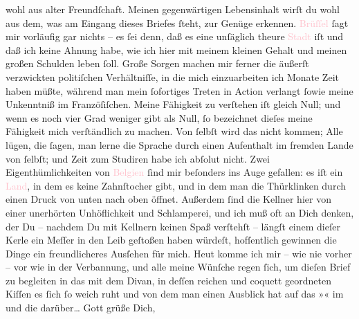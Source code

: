                wohl aus alter Freundſchaft.\pend
           \pstart
           Meinen gegenwärtigen Lebensinhalt wirſt du wohl aus dem, was am Eingang dieses
               Briefes ſteht, zur Genüge erkennen. \textcolor{pink}{Brüſſel}{}\ledrightnote{\textcolor{pink}{Brüssel}} ſagt
               mir vorläufig gar nichts – es ſei denn, daß es eine unſäglich theure \textcolor{pink}{Stadt}{} iſt und daß ich keine Ahnung habe, wie
               ich hier mit meinem kleinen Gehalt und meinen großen Schulden leben ſoll. Große
               Sorgen machen mir ferner die äußerſt verzwickten politiſchen Verhältniſſe, in die
               mich einzuarbeiten ich Monate Zeit haben müßte, während man {\pb}mein ſofortiges Treten in Action verlangt ſowie
               meine Unkenntniß im Franzöſiſchen. Meine Fähigkeit zu verſtehen iſt gleich Null; und
               wenn es noch vier Grad weniger gibt als Null, ſo bezeichnet dieſes meine Fähigkeit
               mich verſtändlich zu machen. Von ſelbſt wird das nicht kommen; Alle lügen, die ſagen,
               man lerne die Sprache durch einen Aufenthalt im fremden Lande von ſelbſt; und Zeit
               zum Studiren habe ich abſolut nicht. Zwei Eigenthümlichkeiten von \textcolor{pink}{Belgien}{}\ledrightnote{\textcolor{pink}{Belgien}} ſind mir beſonders ins Auge gefallen: es iſt ein \textcolor{pink}{Land}{}, in dem es keine
               Zahnſtocher gibt, und in dem man die Thürklinken durch einen Druck von unten nach
               oben öffnet. Außerdem ſind die Kellner hier von einer unerhörten Unhöflichkeit und
               Schlamperei, und ich muß oft an Dich denken, der Du – nachdem Du mit Kellnern keinen
               Spaß verſtehſt – längſt einem dieſer Kerle ein Meſſer in den Leib geſtoßen haben
               würdeſt, hofſentlich gewinnen die Dinge ein freundlicheres Ausſehen für mich. Heut komme ich mir – wie nie vorher – vor wie in der
               Verbannung, und alle meine Wünſche regen ſich, um dieſen Brief zu begleiten in das
                  \label{K_L02663-999v}\label{K_L02663-999h} mit dem Divan, in deſſen reichen und coquett geordneten Kiſſen es
               ſich ſo weich ruht und von dem man einen Ausblick hat auf das »\label{K_L02663-66v}\label{K_L02663-66h}« im \label{K_L02663-444v}\label{K_L02663-444h} und die \label{K_L02663-22v}\label{K_L02663-22h} darüber{\dots} Gott grüße Dich,
